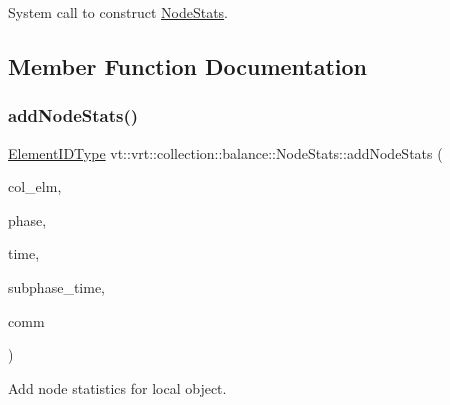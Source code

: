 System call to construct {\ttfamily \hyperlink{structvt_1_1vrt_1_1collection_1_1balance_1_1_node_stats}{Node\+Stats}}. 



\subsection{Member Function Documentation}
\mbox{\label{structvt_1_1vrt_1_1collection_1_1balance_1_1_node_stats_ae4d6db216e4c26de96a367499373a0a5}} 
\subsubsection{\texorpdfstring{add\+Node\+Stats()}{addNodeStats()}}
{\footnotesize\ttfamily \hyperlink{namespacevt_1_1vrt_1_1collection_1_1balance_a14c8d2c972f2913aa3f1636e5be0a120}{Element\+I\+D\+Type} vt\+::vrt\+::collection\+::balance\+::\+Node\+Stats\+::add\+Node\+Stats (\begin{DoxyParamCaption}\item[{\hyperlink{structvt_1_1vrt_1_1collection_1_1_migratable}{Migratable} $\ast$}]{col\+\_\+elm,  }\item[{\hyperlink{namespacevt_a46ce6733d5cdbd735d561b7b4029f6d7}{Phase\+Type} const \&}]{phase,  }\item[{\hyperlink{namespacevt_a876a9d0cd5a952859c72de8a46881442}{Time\+Type} const \&}]{time,  }\item[{std\+::vector$<$ \hyperlink{namespacevt_a876a9d0cd5a952859c72de8a46881442}{Time\+Type} $>$ const \&}]{subphase\+\_\+time,  }\item[{\hyperlink{namespacevt_1_1vrt_1_1collection_1_1balance_a10860c956804d644db54a16012352728}{Comm\+Map\+Type} const \&}]{comm }\end{DoxyParamCaption})}



Add node statistics for local object. 


